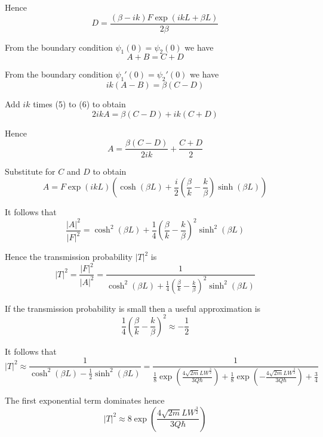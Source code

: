 Hence
\begin{equation*}
D=\frac{(\beta-ik)F\exp(ikL+\beta L)}{2\beta}
\tag{4}
\end{equation*}

From the boundary condition $\psi_1(0)=\psi_2(0)$ we have
\begin{equation*}
A+B=C+D
\tag{5}
\end{equation*}

From the boundary condition $\psi_1'(0)=\psi_2'(0)$ we have
\begin{equation*}
ik(A-B)=\beta(C-D)
\tag{6}
\end{equation*}

Add $ik$ times (5) to (6) to obtain
\begin{equation*}
2ikA=\beta(C-D)+ik(C+D)
\end{equation*}

Hence
\begin{equation*}
A=\frac{\beta(C-D)}{2ik}+\frac{C+D}{2}
\end{equation*}

Substitute for $C$ and $D$ to obtain
\begin{equation*}
A=F\exp(ikL)\left(\cosh(\beta L)+\frac{i}{2}\left(\frac{\beta}{k}-\frac{k}{\beta}\right)\sinh(\beta L)\right)
\end{equation*}

It follows that
\begin{equation*}
\frac{|A|^2}{|F|^2}=\cosh^2(\beta L)+\frac{1}{4}\left(\frac{\beta}{k}-\frac{k}{\beta}\right)^2\sinh^2(\beta L)
\end{equation*}

Hence the transmission probability $|T|^2$ is
\begin{equation*}
|T|^2=\frac{|F|^2}{|A|^2}=\frac{1}{\cosh^2(\beta L)+\frac{1}{4}\left(\frac{\beta}{k}
-\frac{k}{\beta}\right)^2\sinh^2(\beta L)}
\end{equation*}

If the transmission probability is small then a useful approximation is
\begin{equation*}
\frac{1}{4}\left(\frac{\beta}{k}-\frac{k}{\beta}\right)^2
\approx-\frac{1}{2}
\end{equation*}

It follows that
\begin{equation*}
|T|^2\approx\frac{1}{\cosh^2(\beta L)-\frac{1}{2}\sinh^2(\beta L)}
=\frac{1}{\frac{1}{8}\exp\left(\frac{4\sqrt{2m}LW^\frac{3}{2}}{3Q\hbar}\right)
+\frac{1}{8}\exp\left(-\frac{4\sqrt{2m}LW^\frac{3}{2}}{3Q\hbar}\right)+\frac{3}{4}}
\end{equation*}

The first exponential term dominates hence
\begin{equation*}
|T|^2\approx 8\exp\left(\frac{4\sqrt{2m}LW^\frac{3}{2}}{3Q\hbar}\right)
\end{equation*}


